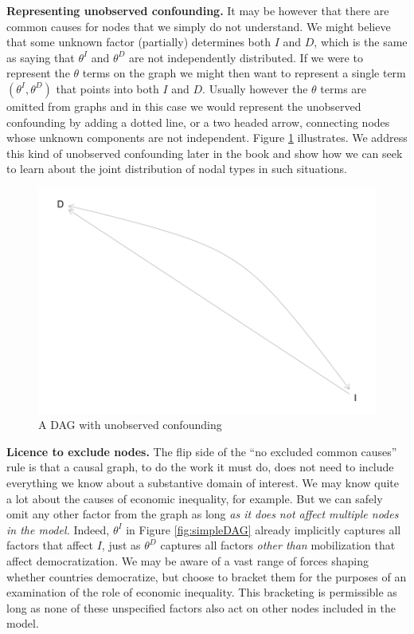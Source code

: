 \documentclass[
  12pt,
]{book}
\begin{document}
\textbf{Representing unobserved confounding.} It may be however that there are common causes for nodes that we simply do not understand. We might believe that some unknown factor (partially) determines both \(I\) and \(D\), which is the same as saying that \(\theta^I\) and \(\theta^D\) are not independently distributed. If we were to represent the \(\theta\) terms on the graph we might then want to represent a single term \((\theta^I, \theta^D)\) that points into both \(I\) and \(D\). Usually however the \(\theta\) terms are omitted from graphs and in this case we would represent the unobserved confounding by adding a dotted line, or a two headed arrow, connecting nodes whose unknown components are not independent. Figure \ref{fig:simpleDAGb} illustrates. We address this kind of unobserved confounding later in the book and show how we can seek to learn about the joint distribution of nodal types in such situations.

\begin{figure}

{\centering \includegraphics[width=0.6\linewidth]{ii_files/figure-latex/simpleDAGb-1} 

}

\caption{A DAG with unobserved confounding}\label{fig:simpleDAGb}
\end{figure}

\textbf{Licence to exclude nodes.} The flip side of the ``no excluded common causes'' rule is that a causal graph, to do the work it must do, does not need to include everything we know about a substantive domain of interest. We may know quite a lot about the causes of economic inequality, for example. But we can safely omit any other factor from the graph as long \emph{as it does not affect multiple nodes in the model.} Indeed, \(\theta^I\) in Figure \ref{fig:simpleDAG} already implicitly captures all factors that affect \(I\), just as \(\theta^D\) captures all factors \emph{other than} mobilization that affect democratization. We may be aware of a vast range of forces shaping whether countries democratize, but choose to bracket them for the purposes of an examination of the role of economic inequality. This bracketing is permissible as long as none of these unspecified factors also act on other nodes included in the model.
\end{document}
